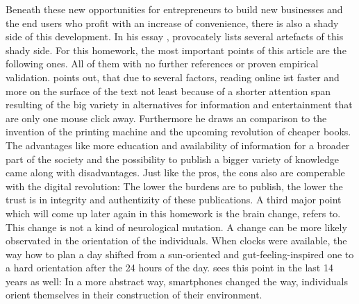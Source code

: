 \documentclass[11pt,letterpaper]{article}
\begin{document}
Beneath these new opportunities for entrepreneurs to build new businesses and the end users who profit with an increase of convenience, there is also a shady side of this development. In his essay , \cite[][]{carr08} provocately lists several artefacts of this shady side. For this homework, the most important points of this article are the following ones. All of them with no further references or proven empirical validation.
\cite[][]{carr08} points out, that due to several factors, reading online ist faster and more on the surface of the text not least because of a shorter attention span resulting of the big variety in alternatives for information and entertainment that are only one mouse click away. Furthermore he draws an comparison to the invention of the printing machine and the upcoming revolution of cheaper books. The advantages like more education and availability of information for a broader part of the society and the possibility to publish a bigger variety of knowledge came along with disadvantages. Just like the pros, the cons also are comperable with the digital revolution: The lower the burdens are to publish, the lower the trust is in integrity and authentizity of these publications. A third major point which will come up later again in this homework is the brain change, \cite[][]{carr08} refers to. This change is not a kind of neurological mutation. A change can be more likely observated in the orientation of the individuals. When clocks were available, the way how to plan a day shifted from a sun-oriented and gut-feeling-inspired one to a hard orientation after the 24 hours of the day. \cite[][]{carr08} sees this point in the last 14 years as well: In a more abstract way, smartphones changed the way, individuals orient themselves in their construction of their environment.
\end{document}
